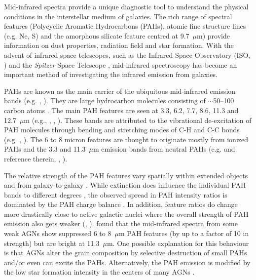 \documentclass[useAMS,usenatbib,a4paper]{mn2e}
\begin{document}
Mid-infrared spectra provide a unique diagnostic tool to understand the physical conditions in the interstellar medium of galaxies. 
The rich range of spectral features (Polycyclic Aromatic Hydrocarbons (PAHs), atomic fine structure lines (e.g. Ne, S) and the
amorphous silicate feature centred at 9.7~$\mu$m) provide information on dust properties, radiation field and star formation. 
With the advent of infrared space telescopes, such as the Infrared Space Observatory (ISO, \citealt{Kessler1996}) and 
the {\em Spitzer} Space Telescope \citep{spitzer2004},  mid-infrared spectroscopy has become an important method
of investigating the infrared emission from galaxies. 

PAHs are known as the main carrier of the ubiquitous mid-infrared emission bands (e.g. \citealt{Allamandola1989}, \citealt{puget89}).
They are large hydrocarbon molecules consisting of $\sim$50--100 carbon atoms \citep{Tielens2008}. 
The main PAH features are seen at 3.3, 6.2, 7.7, 8.6, 11.3 and 12.7~$\mu $m (e.g., \citealt{Gillett:73}, \citealt{Geballe:85}, \citealt{Peeters:toledo:11}). 
These bands are attributed to the vibrational de-excitation of PAH molecules through bending and stretching modes of C-H and C-C bonds (e.g. \citealt{Allamandola1989}, \citealt{puget89}). 
The 6 to 8 micron features are thought to originate mostly from ionized PAHs and the 3.3 and 11.3~$\mu$m 
emission bands from neutral PAHs (e.g. \citealt{Hudgins:rev:04} and reference therein, \citealt{Hony:oops:01},  \citealt{Galliano:08}). 

The relative strength of the PAH features vary spatially within extended objects and from galaxy-to-galaxy \citep[e.g.][]{Galliano:08}. While extinction does influence the individual PAH bands to different degrees \citep[e.g.][]{Brandl2006, Stock:13}, the observed spread in PAH intensity ratios is dominated by the PAH charge balance \citep{Galliano:08}. In addition, feature ratios do change more drastically close to active galactic nuclei where the overall strength of PAH emission also gets weaker (\citealt{Roche1991}, \citealt{Smith:2007lr}). \citet{Smith:2007lr} found that the mid-infrared 
spectra from some weak AGNs show suppressed 6 to 8~$\mu$m PAH features (by up to a factor of 10 in strength) but are bright at 11.3~$\mu$m. One possible explanation for this behaviour is that AGNs alter the grain composition by selective destruction of small PAHs and/or even can excite the PAHs. Alternatively, the PAH emission is modified by the low star formation intensity in the centers of many AGNs \citep{Smith:2007lr}. 
\end{document}
